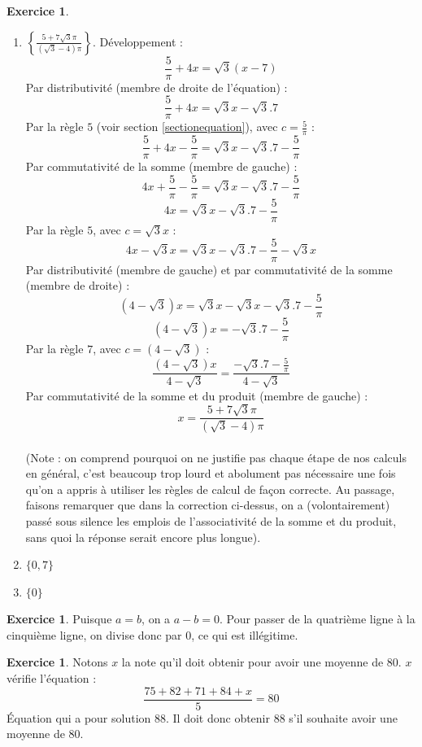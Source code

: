 \documentclass[a4paper,13pt]{scrreprt}
\theoremstyle{plain}
\theoremstyle{definition}
\newtheorem{exo}[subsection]{Exercice}
\begin{document}
\begin{exo}
	\begin{enumerate}
		\item $\left\{ \frac{5 + 7\sqrt{3} \pi}{(\sqrt{3}-4)\pi} \right\}$. Développement : 
		$$\frac{5}{\pi} +4x = \sqrt{3}(x-7)$$
		Par distributivité (membre de droite de l'équation) :
		$$\frac{5}{\pi} +4x = \sqrt{3}x-\sqrt{3}.7$$
		Par la règle $5$ (voir section \ref{sectionequation}), avec $c = \frac{5}{\pi}$ :
		$$\frac{5}{\pi} +4x -  \frac{5}{\pi} = \sqrt{3}x-\sqrt{3} . 7 -  \frac{5}{\pi}$$
		Par commutativité de la somme (membre de gauche) :
		$$4x + \frac{5}{\pi} -  \frac{5}{\pi} = \sqrt{3}x-\sqrt{3} . 7 -  \frac{5}{\pi}$$
		$$4x=\sqrt{3}x-\sqrt{3} . 7 -  \frac{5}{\pi}$$
		Par la règle $5$, avec $c = \sqrt{3}x$ :
		$$4x-\sqrt{3}x=\sqrt{3}x-\sqrt{3}.7 -  \frac{5}{\pi}-\sqrt{3}x$$
		Par distributivité (membre de gauche) et par commutativité de la somme (membre de droite) :
		$$(4-\sqrt{3})x=\sqrt{3}x-\sqrt{3}x-\sqrt{3}.7 -  \frac{5}{\pi}$$
		$$(4-\sqrt{3})x=-\sqrt{3}.7 -  \frac{5}{\pi}$$
		Par la règle $7$, avec $c = (4-\sqrt{3})$ :
		$$\frac{(4-\sqrt{3})x}{4-\sqrt{3}}=\frac{-\sqrt{3}.7 -  \frac{5}{\pi}}{4-\sqrt{3}}$$
		Par commutativité de la somme et du produit (membre de gauche) :
		$$x=\frac{5 + 7\sqrt{3} \pi}{(\sqrt{3}-4)\pi}$$
		~~\\
		(Note : on comprend pourquoi on ne justifie pas chaque étape de nos calculs en général, c'est beaucoup trop lourd et abolument pas nécessaire une fois qu'on a appris à utiliser les règles de calcul de façon correcte. Au passage, faisons remarquer que dans la correction ci-dessus, on a (volontairement) passé sous silence les emplois de l'associativité de la somme et du produit, sans quoi la réponse serait encore plus longue).
		\item $\{ 0,7 \}$
		\item $\{ 0 \}$
	\end{enumerate}
\end{exo}

\begin{exo}
	Puisque $a=b$, on a $a-b=0$. Pour passer de la quatrième ligne à la cinquième ligne, on divise donc par $0$, ce qui est illégitime.
\end{exo}

\begin{exo}
	Notons $x$ la note qu'il doit obtenir pour avoir une moyenne de $80$. $x$ vérifie l'équation :
	$$\frac{75+82+71+84+x}{5}=80$$
	\'Equation qui a pour solution $88$. Il doit donc obtenir $88$ s'il souhaite avoir une moyenne de $80$.
\end{exo}
\end{document}
